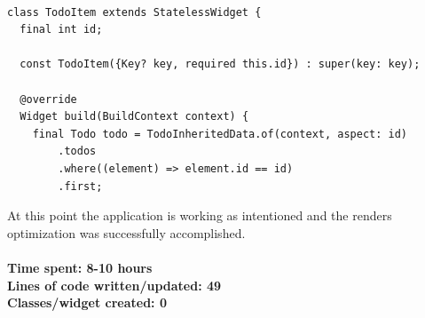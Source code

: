 \begin{verbatim}

class TodoItem extends StatelessWidget {
  final int id;

  const TodoItem({Key? key, required this.id}) : super(key: key);

  @override
  Widget build(BuildContext context) {
    final Todo todo = TodoInheritedData.of(context, aspect: id)
        .todos
        .where((element) => element.id == id)
        .first;
\end{verbatim}

At this point the application is working as intentioned and the renders optimization was successfully accomplished. \\
\\
\textbf{Time spent: 8-10 hours\\
Lines of code written/updated: 49\\ 
Classes/widget created: 0 \\
}





